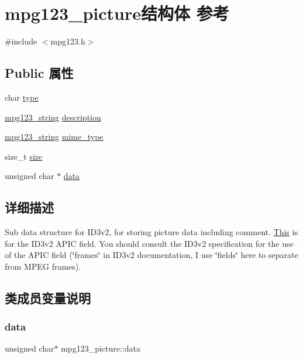 \hypertarget{structmpg123__picture}{}\section{mpg123\+\_\+picture结构体 参考}
\label{structmpg123__picture}


{\ttfamily \#include $<$mpg123.\+h$>$}

\subsection*{Public 属性}
\begin{DoxyCompactItemize}
\item 
char \hyperlink{structmpg123__picture_a4b5897550d36cad90aa463e318a7ca54}{type}
\item 
\hyperlink{structmpg123__string}{mpg123\+\_\+string} \hyperlink{structmpg123__picture_a2bd7ec13cbd4cbe673cdccf5a0603a94}{description}
\item 
\hyperlink{structmpg123__string}{mpg123\+\_\+string} \hyperlink{structmpg123__picture_ac36b86a29200e2df5ee60e9d73c231a6}{mime\+\_\+type}
\item 
size\+\_\+t \hyperlink{structmpg123__picture_adac68a10895739d1d1772f6340c384eb}{size}
\item 
unsigned char $\ast$ \hyperlink{structmpg123__picture_a988df48f24da301a7c80f8da5cf7a17c}{data}
\end{DoxyCompactItemize}


\subsection{详细描述}
Sub data structure for I\+D3v2, for storing picture data including comment. \hyperlink{namespace_this}{This} is for the I\+D3v2 A\+P\+IC field. You should consult the I\+D3v2 specification for the use of the A\+P\+IC field (\char`\"{}frames\char`\"{} in I\+D3v2 documentation, I use \char`\"{}fields\char`\"{} here to separate from M\+P\+EG frames). 

\subsection{类成员变量说明}
\mbox{\label{structmpg123__picture_a988df48f24da301a7c80f8da5cf7a17c}} 
\subsubsection{\texorpdfstring{data}{data}}
{\footnotesize\ttfamily unsigned char$\ast$ mpg123\+\_\+picture\+::data}

